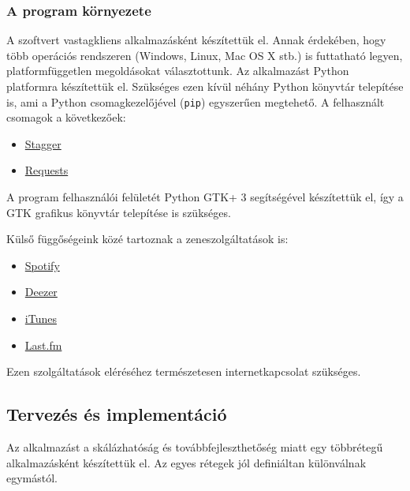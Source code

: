 \subsubsection{A program környezete}
\label{ssub:aprogramkornyezete}

A szoftvert vastagkliens alkalmazásként készítettük el. Annak érdekében, hogy több operációs rendszeren (Windows, Linux, Mac OS X stb.) is futtatható legyen, platformfüggetlen megoldásokat választottunk. Az alkalmazást Python platformra készítettük el. Szükséges ezen kívül néhány Python könyvtár telepítése is, ami a Python csomagkezelőjével (\texttt{pip}) egyszerűen megtehető. A felhasznált csomagok a következőek:

\begin{itemize}
	\item \href{https://code.google.com/p/stagger/}{Stagger}
	\item \href{http://docs.python-requests.org/}{Requests}
\end{itemize}

A program felhasználói felületét Python GTK+ 3 segítségével készítettük el, így a GTK grafikus könyvtár telepítése is szükséges.

Külső függőségeink közé tartoznak a zeneszolgáltatások is: 
\begin{itemize}
	\item \href{https://developer.spotify.com/web-api/}{Spotify}
    \item \href{http://developers.deezer.com/api/}{Deezer}
    \item \href{https://www.apple.com/itunes/affiliates/resources/documentation/itunes-store-web-service-search-api.html}{iTunes}
    \item \href{http://www.last.fm/api}{Last.fm}
\end{itemize}
Ezen szolgáltatások eléréséhez természetesen internetkapcsolat szükséges.



\subsection{Tervezés és implementáció}
\label{sub:tervezesesimplementacio}

Az alkalmazást a skálázhatóság és továbbfejleszthetőség miatt egy többrétegű alkalmazásként készítettük el. Az egyes rétegek jól definiáltan különválnak egymástól.
 
